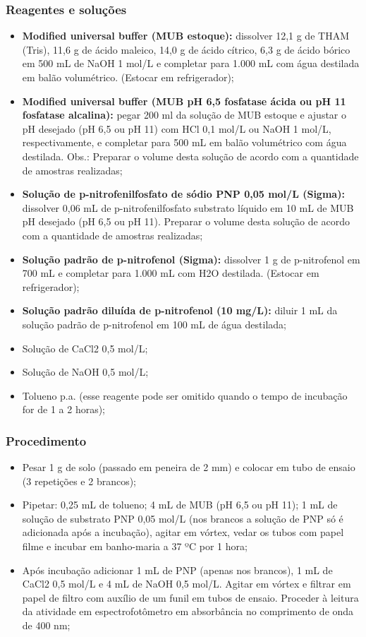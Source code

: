 \subsubsection{Reagentes e soluções}
\begin{itemize}
   \item \textbf{Modified universal buffer (MUB estoque):} dissolver 12,1 g de THAM (Tris), 11,6 g de ácido maleico, 14,0 g de ácido cítrico, 6,3 g de ácido bórico em 500 mL de NaOH 1 mol/L e completar para 1.000 mL com água destilada em balão volumétrico. (Estocar em refrigerador);
   \item \textbf{Modified universal buffer (MUB pH 6,5 fosfatase ácida ou pH 11 fosfatase alcalina):} pegar 200 ml da solução de MUB estoque e ajustar o pH desejado (pH 6,5 ou pH 11) com HCl 0,1 mol/L ou NaOH 1 mol/L, respectivamente, e completar para 500 mL em balão volumétrico com água destilada. Obs.: Preparar o volume desta solução de acordo com a quantidade de amostras realizadas;
   \item \textbf{Solução de p-nitrofenilfosfato de sódio PNP 0,05 mol/L (Sigma):} dissolver 0,06 mL de p-nitrofenilfosfato substrato líquido em 10 mL de MUB pH desejado (pH 6,5 ou pH 11). Preparar o volume desta solução de acordo com a quantidade de amostras realizadas;
   \item \textbf{Solução padrão de p-nitrofenol (Sigma):} dissolver 1 g de p-nitrofenol em 700 mL e completar para 1.000 mL com H2O destilada. (Estocar em refrigerador);
   \item \textbf{Solução padrão diluída de p-nitrofenol (10 mg/L):} diluir 1 mL da solução padrão de p-nitrofenol em 100 mL de água destilada;
   \item Solução de CaCl2 0,5 mol/L;
   \item Solução de NaOH 0,5 mol/L;
   \item Tolueno p.a. (esse reagente pode ser omitido quando o tempo de incubação for de 1 a 2 horas);
 \end{itemize}

\subsubsection{Procedimento}
\begin{itemize}
   \item Pesar 1 g de solo (passado em peneira de 2 mm) e colocar em tubo de ensaio (3 repetições e 2 brancos);
   \item Pipetar: 0,25 mL de tolueno; 4 mL de MUB (pH 6,5 ou pH 11); 1 mL de solução de substrato PNP 0,05 mol/L (nos brancos a solução de PNP só é adicionada após a incubação), agitar em vórtex, vedar os tubos com papel filme e incubar em banho-maria a 37 ºC por 1 hora;
   \item Após incubação adicionar 1 mL de PNP (apenas nos brancos), 1 mL de CaCl2 0,5 mol/L e 4 mL de NaOH 0,5 mol/L. Agitar em vórtex e filtrar em papel de filtro com auxílio de um funil em tubos de ensaio. Proceder à leitura da atividade em espectrofotômetro em absorbância no comprimento de onda de 400 nm;
 \end{itemize}

